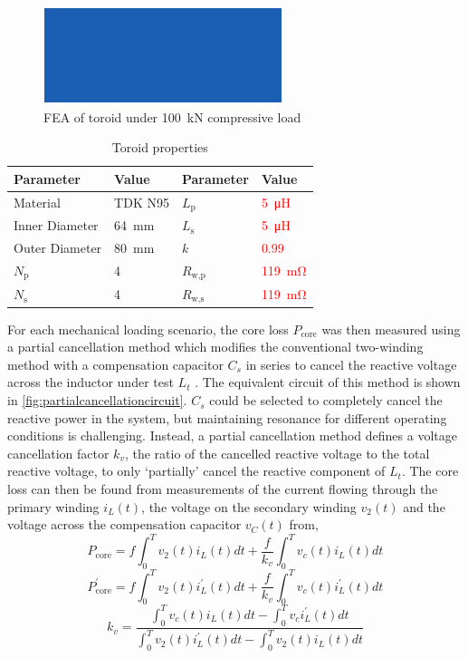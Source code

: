 \documentclass[conference]{IEEEtran}
\begin{document}
\begin{figure}
  \centering
  \includegraphics{figures/holderfea.pdf}
  \caption{FEA of toroid under \SI{100}{\kilo\newton} compressive load}
  \label{fig:holderfea}
\end{figure}
\begin{table}
  \centering
  \caption{Toroid properties}
  \begin{tabular}{@{}llll@{}}
    \toprule
    Parameter & Value & Parameter & Value \\ \midrule
    Material & TDK N95 & $L_\text{p}$ & \textcolor{red}{\SI{5}{\micro\henry}} \\
    Inner Diameter & \SI{64}{\milli\meter} & $L_\text{s}$ & \textcolor{red}{\SI{5}{\micro\henry}} \\
    Outer Diameter & \SI{80}{\milli\meter} & $k$ & \textcolor{red}{$0.99$} \\
    $N_\text{p}$ & 4 & $R_\text{w,p}$ & \textcolor{red}{\SI{119}{\milli\ohm}} \\
    $N_\text{s}$ & 4 & $R_\text{w,s}$ & \textcolor{red}{\SI{119}{\milli\ohm}} \\
    \bottomrule
  \end{tabular}
\end{table}

For each mechanical loading scenario, the core loss $P_\text{core}$ was then measured using a partial cancellation method which modifies the conventional two-winding method with a compensation capacitor $C_s$ in series to cancel the reactive voltage across the inductor under test $L_t$ \cite{houNewHighFrequencyCore2017}. 
The equivalent circuit of this method is shown in \cref{fig:partialcancellationcircuit}.
$C_s$ could be selected to completely cancel the reactive power in the system, but maintaining resonance for different operating conditions is challenging. 
Instead, a partial cancellation method defines a voltage cancellation factor $k_v$, the ratio of the cancelled reactive voltage to the total reactive voltage, to only `partially' cancel the reactive component of $L_t$. 
The core loss can then be found from measurements of the current flowing through the primary winding $i_L(t)$, the voltage on the secondary winding $v_2(t)$ and the voltage across the compensation capacitor $v_C(t)$ from, 
\begin{equation}
  P_\text{core} = f \int_0^T v_2(t)i_L(t)dt + \frac{f}{k_v} \int_0^T v_c(t)i_L(t) dt
\end{equation}
\begin{equation}
  P_\text{core}^{\prime} = f \int_0^T v_2(t)i_L^{\prime} (t)dt + \frac{f}{k_v} \int_0^T v_c(t)i_L^{\prime}(t) dt
\end{equation}
\begin{equation}
  k_v = \frac{\int_0^T v_c(t)i_L(t)dt - \int_0^T v_ci_L^\prime(t)dt}{\int_0^T v_2(t) i_L^\prime(t) dt - \int_0^T v_2(t) i_L(t) dt}
\end{equation}
\end{document}
